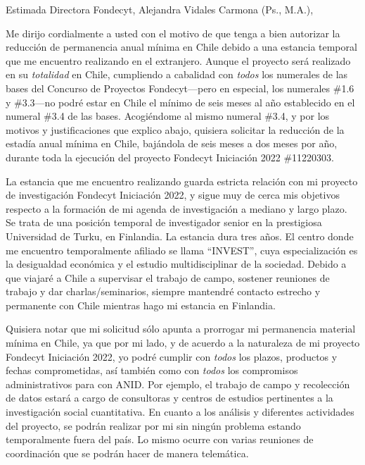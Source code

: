 \documentclass[9pt,stdletter,dateno,sigleft,openany]{newlfm} %
\begin{document}
\begin{newlfm}




\vspace{-2cm}
Estimada Directora Fondecyt, Alejandra Vidales Carmona (Ps., M.A.),

Me dirijo cordialmente a usted con el motivo de que tenga a bien autorizar la reducci\'on de permanencia anual m\'inima en Chile debido a una estancia temporal que me encuentro realizando en el extranjero. Aunque el proyecto ser\'a realizado en su \emph{totalidad} en Chile, cumpliendo a cabalidad con \emph{todos} los numerales de las bases del Concurso de Proyectos Fondecyt---pero en especial, los numerales \#1.6 y \#3.3---no podr\'e estar en Chile el m\'inimo de seis meses al a\~no establecido en el numeral \#3.4 de las bases. Acogi\'endome al mismo numeral \#3.4, y por los motivos y justificaciones que explico abajo, quisiera solicitar la reducci\'on de la estad\'ia anual m\'inima en Chile, baj\'andola de seis meses a dos meses por a\~no, durante toda la ejecuci\'on del proyecto Fondecyt Iniciaci\'on 2022 \#11220303. 

La estancia que me encuentro realizando guarda estricta relaci\'on con mi proyecto de investigaci\'on Fondecyt Iniciaci\'on 2022, y sigue muy de cerca mis objetivos respecto a la formaci\'on de mi agenda de investigaci\'on a mediano y largo plazo. Se trata de una posici\'on temporal de investigador senior en la prestigiosa Universidad de Turku, en Finlandia. La estancia dura tres a\~nos. El centro donde me encuentro temporalmente afiliado se llama ``INVEST'', cuya especializaci\'on es la desigualdad econ\'omica y el estudio multidisciplinar de la sociedad. Debido a que viajar\'e a Chile a supervisar el trabajo de campo, sostener reuniones de trabajo y dar charlas/seminarios, siempre mantendr\'e contacto estrecho y permanente con Chile mientras hago mi estancia en Finlandia. 

Quisiera notar que mi solicitud s\'olo apunta a prorrogar mi permanencia material m\'inima en Chile, ya que por mi lado, y de acuerdo a la naturaleza de mi proyecto Fondecyt Iniciaci\'on 2022, yo podr\'e cumplir con \emph{todos} los plazos, productos y fechas comprometidas, as\'i tambi\'en como con \emph{todos} los compromisos administrativos para con ANID. Por ejemplo, el trabajo de campo y recolecci\'on de datos estar\'a a cargo de consultoras y centros de estudios pertinentes a la investigaci\'on social cuantitativa. En cuanto a los an\'alisis y diferentes actividades del proyecto, se podr\'an realizar por mi sin ning\'un problema estando temporalmente fuera del pa\'is. Lo mismo ocurre con varias reuniones de coordinaci\'on que se podr\'an hacer de manera telem\'atica.


\end{newlfm}
\end{document}
